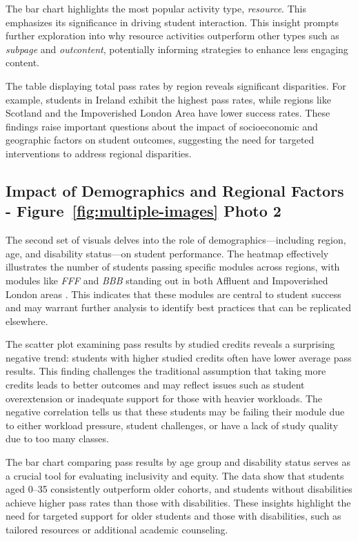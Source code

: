 The bar chart highlights the most popular activity type, \textit{resource}. This emphasizes its significance in driving student interaction. This insight prompts further exploration into why resource activities outperform other types such as \textit{subpage} and \textit{outcontent}, potentially informing strategies to enhance less engaging content.

The table displaying total pass rates by region reveals significant disparities. For example, students in Ireland exhibit the highest pass rates, while regions like Scotland and the Impoverished London Area have lower success rates. These findings raise important questions about the impact of socioeconomic and geographic factors on student outcomes, suggesting the need for targeted interventions to address regional disparities.

\subsection*{Impact of Demographics and Regional Factors - Figure~\ref{fig:multiple-images} Photo 2}

The second set of visuals delves into the role of demographics—including region, age, and disability status—on student performance. The heatmap effectively illustrates the number of students passing specific modules across regions, with modules like \textit{FFF} and \textit{BBB} standing out in both Affluent and Impoverished London areas \cite{IMD2019}. This indicates that these modules are central to student success and may warrant further analysis to identify best practices that can be replicated elsewhere.

The scatter plot examining pass results by studied credits reveals a surprising negative trend: students with higher studied credits often have lower average pass results. This finding challenges the traditional assumption that taking more credits leads to better outcomes and may reflect issues such as student overextension or inadequate support for those with heavier workloads. The negative correlation tells us that these students may be failing their module due to either workload pressure, student challenges, or have a lack of study quality due to too many classes.

The bar chart comparing pass results by age group and disability status serves as a crucial tool for evaluating inclusivity and equity. The data show that students aged 0--35 consistently outperform older cohorts, and students without disabilities achieve higher pass rates than those with disabilities. These insights highlight the need for targeted support for older students and those with disabilities, such as tailored resources or additional academic counseling.

